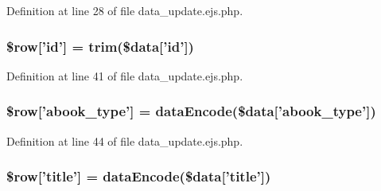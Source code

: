 \-Definition at line 28 of file data\-\_\-update.\-ejs.\-php.

\hypertarget{miscellaneous_2mysettings_2data__update_8ejs_8php_a4d5e7bc8bd41ef1d4dbfdb851ced695a}{
\subsubsection[{\$row}]{\setlength{\rightskip}{0pt plus 5cm}\$row\mbox{[}'id'\mbox{]} = trim(\$data\mbox{[}'id'\mbox{]})}}\label{miscellaneous_2mysettings_2data__update_8ejs_8php_a4d5e7bc8bd41ef1d4dbfdb851ced695a}


\-Definition at line 41 of file data\-\_\-update.\-ejs.\-php.

\hypertarget{miscellaneous_2mysettings_2data__update_8ejs_8php_a0d1b6e8abe038ac8d97ac3bcaffc1aec}{
\subsubsection[{\$row}]{\setlength{\rightskip}{0pt plus 5cm}\$row\mbox{[}'abook\-\_\-type'\mbox{]} = {\bf data\-Encode}(\$data\mbox{[}'abook\-\_\-type'\mbox{]})}}\label{miscellaneous_2mysettings_2data__update_8ejs_8php_a0d1b6e8abe038ac8d97ac3bcaffc1aec}


\-Definition at line 44 of file data\-\_\-update.\-ejs.\-php.

\hypertarget{miscellaneous_2mysettings_2data__update_8ejs_8php_a70d36cba6a35524466f2a4c8112c8e4e}{
\subsubsection[{\$row}]{\setlength{\rightskip}{0pt plus 5cm}\$row\mbox{[}'title'\mbox{]} = {\bf data\-Encode}(\$data\mbox{[}'title'\mbox{]})}}\label{miscellaneous_2mysettings_2data__update_8ejs_8php_a70d36cba6a35524466f2a4c8112c8e4e}


